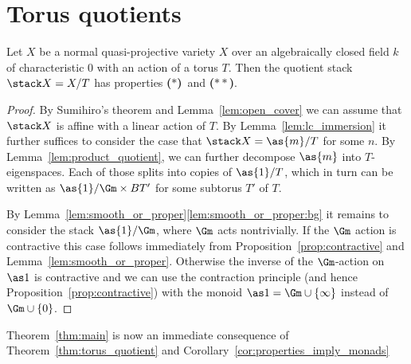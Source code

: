 \documentclass{ck-article}
\newcommand\bc{\textbf{($\mathbf{*}$)}}
\newcommand\hbc{\textbf{($\mathbf{**}$)}}
\begin{document}
\section{Torus quotients}\label{sec:torus}

\begin{Thm}\label{thm:torus_quotient}
    Let $X$ be a normal quasi-projective variety $X$ over an algebraically closed field $k$ of characteristic $0$ with an action of a torus $T$.
    Then the quotient stack $\stack X = X/T$ has properties \bc\ and \hbc.
\end{Thm}

\begin{proof}
  By Sumihiro's theorem \cite{Sumihiro:1974:EquivariantCompletions} and Lemma~\ref{lem:open_cover} we can assume that $\stack X$ is affine with a linear action of $T$.
  By Lemma~\ref{lem:lc_immersion} it further suffices to consider the case that $\stack X = \as{m}/T$ for some $n$.
  By Lemma~\ref{lem:product_quotient}, we can further decompose $\as{m}$ into $T$-eigenspaces.
  Each of those splits into copies of $\as{1}/T$, which in turn can be written as $\as{1}/\Gm \times BT'$ for some subtorus $T'$ of $T$.
  
  By Lemma~\ref{lem:smooth_or_proper}\ref{lem:smooth_or_proper:bg} it remains to consider the stack $\as{1}/\Gm$, where $\Gm$ acts nontrivially.
  If the $\Gm$ action is contractive this case follows immediately from Proposition~\ref{prop:contractive} and Lemma~\ref{lem:smooth_or_proper}.
  Otherwise the inverse of the $\Gm$-action on $\as1$ is contractive and we can use the contraction principle (and hence Proposition~\ref{prop:contractive}) with the monoid $\as1 = \Gm \cup \{\infty\}$ instead of $\Gm \cup \{0\}$.
\end{proof}

Theorem~\ref{thm:main} is now an immediate consequence of Theorem~\ref{thm:torus_quotient} and Corollary~\ref{cor:properties_imply_monads}
\end{document}
